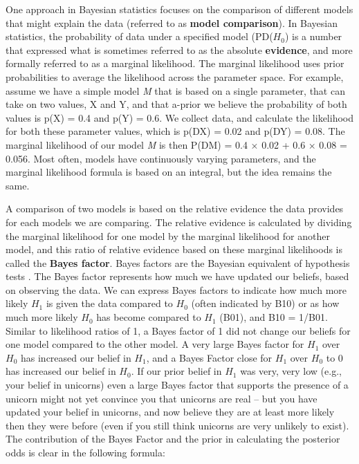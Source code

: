 \documentclass[
  oneside]{krantz}
\begin{document}
One approach in Bayesian statistics focuses on the comparison of different models that might explain the data (referred to as \textbf{model comparison}). In Bayesian statistics, the probability of data under a specified model (P\textbar D(\(H_0\)) is a number that expressed what is sometimes referred to as the absolute \textbf{evidence}, and more formally referred to as a marginal likelihood. The marginal likelihood uses prior probabilities to average the likelihood across the parameter space. For example, assume we have a simple model \emph{M} that is based on a single parameter, that can take on two values, X and Y, and that a-prior we believe the probability of both values is p(X) = 0.4 and p(Y) = 0.6. We collect data, and calculate the likelihood for both these parameter values, which is p(D\textbar X) = 0.02 and p(D\textbar Y) = 0.08. The marginal likelihood of our model \emph{M} is then P(D\textbar M) = 0.4 × 0.02 + 0.6 × 0.08 = 0.056. Most often, models have continuously varying parameters, and the marginal likelihood formula is based on an integral, but the idea remains the same.

A comparison of two models is based on the relative evidence the data provides for each models we are comparing. The relative evidence is calculated by dividing the marginal likelihood for one model by the marginal likelihood for another model, and this ratio of relative evidence based on these marginal likelihoods is called the \textbf{Bayes factor}. Bayes factors are the Bayesian equivalent of hypothesis tests \citep{dienes_understanding_2008, kass_bayes_1995}. The Bayes factor represents how much we have updated our beliefs, based on observing the data. We can express Bayes factors to indicate how much more likely \(H_1\) is given the data compared to \(H_0\) (often indicated by B10) or as how much more likely \(H_0\) has become compared to \(H_1\) (B01), and B10 = 1/B01. Similar to likelihood ratios of 1, a Bayes factor of 1 did not change our beliefs for one model compared to the other model. A very large Bayes factor for \(H_1\) over \(H_0\) has increased our belief in \(H_1\), and a Bayes Factor close for \(H_1\) over \(H_0\) to 0 has increased our belief in \(H_0\). If our prior belief in \(H_1\) was very, very low (e.g., your belief in unicorns) even a large Bayes factor that supports the presence of a unicorn might not yet convince you that unicorns are real -- but you have updated your belief in unicorns, and now believe they are at least more likely then they were before (even if you still think unicorns are very unlikely to exist). The contribution of the Bayes Factor and the prior in calculating the posterior odds is clear in the following formula:
\end{document}
